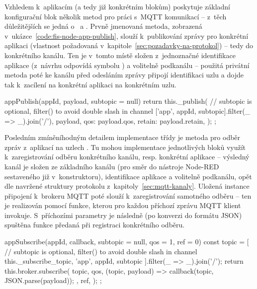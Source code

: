 Vzhledem k~aplikacím (a tedy již konkrétním blokům) poskytuje základní konfigurační blok několik metod pro práci
s~MQTT komunikací -- z~těch důležitějších se jedná o~ a .
Prvně jmenovaná metoda, zobrazená v~ukázce~\ref{code:fis-node-app-publish}, slouží k~publikování zprávy pro
konkrétní aplikaci (vlastnost požadovaná v~kapitole~\ref{sec:pozadavky-na-protokol}) -- tedy do konkrétního kanálu.
Ten je v~tomto místě složen z~jednoznačné identifikace aplikace  (z~návrhu odpovídá symbolu ) a
volitelně podkanálu -- použitá privátní metoda  poté ke kanálu před odesláním zprávy připojí identifikaci
uzlu a dojde tak k~zacílení na konkrétní aplikaci na konkrétním uzlu.

\begin{code}[
    language=Javascript,
    label=code:fis-node-app-publish,
    caption={Detail z~implementace třídy \ic{FisNode} -- metoda \ic{appPublish} poskytuje možnost konkrétnímu bloku
    odeslání zprávy do odpovídající aplikace na uzlu, resp. do konkrétního subkanálu.}
]
appPublish(appId, payload, subtopic = null) {
    return this._publish(
        // subtopic is optional, filter() to avoid double slash in channel
        ['app', appId, subtopic].filter(_ => _).join('/'),
        {
            payload,
            qos: payload.qos,
            retain: payload.retain,
        }
    );
};
\end{code}

Posledním zmíněníhodným detailem implementace třídy  je metoda pro odběr zpráv z~aplikací na uzlech
.
Tu mohou implementace jednotlivých bloků využít k~zaregistrování odběru konkrétního kanálu, resp. konkrétní aplikace
-- výsledný kanál je složen ze základního kanálu (pro směr do nástroje Node-RED sestaveného již v~konstruktoru),
identifikace aplikace  a volitelně podkanálu, opět dle navržené struktury protokolu z~kapitoly~\ref{sec:mqtt-kanaly}.
Uložená instance připojení k~brokeru MQTT poté slouží k~zaregistrování samotného odběru -- ten je realizován pomocí
funkce, kterou pro každou příchozí zprávu MQTT klient invokuje.
S~příchozími parametry je následně (po konverzi do formátu JSON) spuštěna funkce předaná při registraci konkrétního
odběru.

\begin{code}[
    language=Javascript,
    label=code:fis-node-app-subscribe,
    caption={Detail z~implementace třídy \ic{FisNode} -- metoda \ic{appSubscribe} je určená k~zaregistrování odběru
    kanálu odpovídajícího konkrétní aplikaci na konkrétním uzlu.
    Parametr \ic{qos} slouží k~nastavení konkrétní hodnoty QoS pro tento odběr, \ic{ref} je volitelná identifikace
    odběru, s~jejíž pomocí lze mazat konkrétní odběry.}
]
appSubscribe(appId, callback, subtopic = null, qos = 1, ref = 0) {
    const topic = [
        // subtopic is optional, filter() to avoid double slash in channel
        this._subscribe_topic, 'app', appId, subtopic
    ].filter(_ => _).join('/');
    return this.broker.subscribe(
        topic,
        qos,
        (topic, payload) => {
            callback(topic, JSON.parse(payload));
        },
        ref,
    );
};
\end{code}


